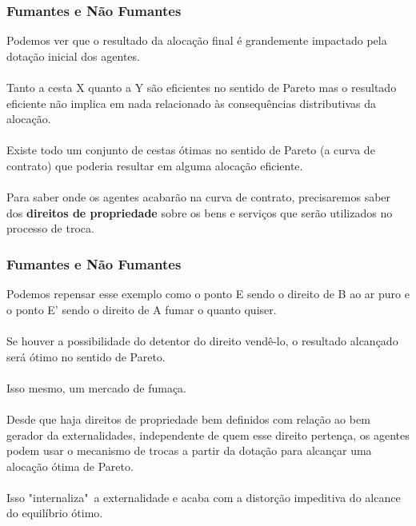 \documentclass{beamer}[10]
\begin{document}
\begin{frame}
	\frametitle{Fumantes e Não Fumantes}

	Podemos ver que o resultado da alocação final é grandemente impactado pela dotação inicial dos agentes.
	\\~\\
	Tanto a cesta X quanto a Y são eficientes no sentido de Pareto mas o resultado eficiente não implica em nada relacionado às consequências distributivas da alocação.
	\\~\\
	Existe todo um conjunto de cestas ótimas no sentido de Pareto (a curva de contrato) que poderia resultar em alguma alocação eficiente.
	\\~\\
	Para saber onde os agentes acabarão na curva de contrato, precisaremos saber dos \textbf{direitos de propriedade} sobre os bens e serviços que serão utilizados no processo de troca.

\end{frame}

\begin{frame}
	\frametitle{Fumantes e Não Fumantes}

	Podemos repensar esse exemplo como o ponto E sendo o direito de B ao ar puro e o ponto E' sendo o direito de A fumar o quanto quiser.
	\\~\\
	Se houver a possibilidade do detentor do direito vendê-lo, o resultado alcançado será ótimo no sentido de Pareto.
	\\~\\
	Isso mesmo, um mercado de fumaça.
	\\~\\
	Desde que haja direitos de propriedade bem definidos com relação ao bem gerador da externalidades, independente de quem esse direito pertença, os agentes podem usar o mecanismo de trocas a partir da dotação para alcançar uma alocação ótima de Pareto.
	\\~\\
	Isso "internaliza"\ a externalidade e acaba com a distorção impeditiva do alcance do equilíbrio ótimo.

\end{frame}
\end{document}
